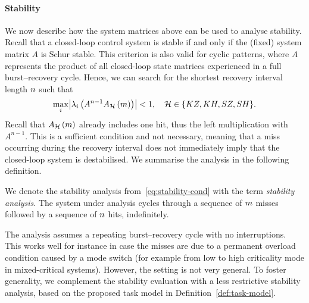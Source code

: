 \paragraph*{Stability}%

We now describe how the system matrices above can be used to analyse stability. 
Recall that a closed-loop control system is stable if and only if the (fixed) system matrix $A$ is Schur stable. 
This criterion is also valid for cyclic patterns, where $A$ represents the product of all closed-loop state matrices experienced in a full burst--recovery cycle. 
Hence, we can search for the shortest recovery interval length $n$ such that
%
\begin{equation}
\underset{i}{\max}{\left|\lambda_{i}\left( A^{n-1}A_{\mathcal{H}}\left(m\right) \right)\right|} < 1, \quad \mathcal{H} \in  \{ KZ, KH, SZ, SH \}.
\label{eq:stability-cond}
\end{equation}
%
Recall that $A_{\mathcal{H}}\left(m\right)$ already includes one hit, thus the left multiplication with $A^{n-1}$. 
This is a sufficient condition and not necessary, meaning that a miss occurring during the recovery interval does not immediately imply that the closed-loop system is destabilised. 
We summarise the analysis in the following definition.

\begin{definition}
We denote the stability analysis from~\eqref{eq:stability-cond} with the term \emph{\nilsstability{} stability analysis}.
The system under analysis cycles through a
sequence of $m$ misses followed by a sequence of $n$ hits, indefinitely.
\end{definition}
%
The \nilsstability{} analysis assumes a repeating burst--recovery cycle with no interruptions. This works well for instance in case the misses are due to a permanent overload condition caused by a mode switch (for example from low to high criticality mode in mixed-critical systems). However, the setting is not very general. To foster generality, we complement the stability evaluation with a less restrictive stability analysis, based on the proposed task model in Definition~\ref{def:task-model}.

